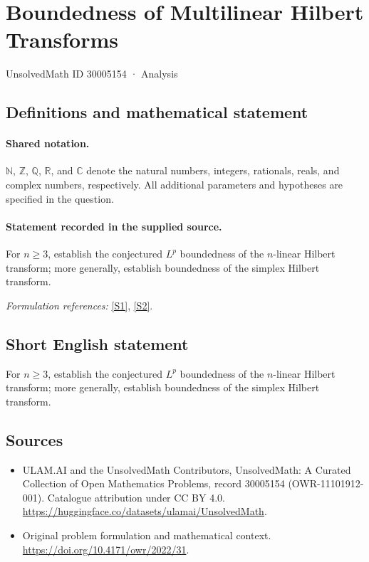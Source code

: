 \documentclass[11pt]{article}
\newcommand{\sref}[2]{\hyperlink{source:#1:#2}{[S#2]}}
\begin{document}
\setcounter{section}{30005153}
\section{Boundedness of Multilinear Hilbert Transforms}\label{30005154}
{\small UnsolvedMath ID 30005154 · Analysis}
\subsection{Definitions and mathematical statement}

\paragraph{Shared notation.}$\mathbb N$, $\mathbb Z$, $\mathbb Q$, $\mathbb R$, and $\mathbb C$ denote the natural numbers, integers, rationals, reals, and complex numbers, respectively. All additional parameters and hypotheses are specified in the question.


\paragraph{Statement recorded in the supplied source.}
For $n\geq3$, establish the conjectured $L^p$ boundedness of the $n$-linear Hilbert transform; more generally, establish boundedness of the simplex Hilbert transform.
\par\smallskip\textit{Formulation references:} \sref{30005154}{1}, \sref{30005154}{2}.
\subsection{Short English statement}
For $n\geq3$, establish the conjectured $L^p$ boundedness of the $n$-linear Hilbert transform; more generally, establish boundedness of the simplex Hilbert transform.
\subsection{Sources}
\begin{itemize}
\item[\hypertarget{source:30005154:1}{S1}] ULAM.AI and the UnsolvedMath Contributors, UnsolvedMath: A Curated Collection of Open Mathematics Problems, record 30005154 (OWR-11101912-001). Catalogue attribution under CC BY 4.0.
\url{https://huggingface.co/datasets/ulamai/UnsolvedMath}.
\item[\hypertarget{source:30005154:2}{S2}] Original problem formulation and mathematical context.
\url{https://doi.org/10.4171/owr/2022/31}.
\end{itemize}
\label{end:30005154}
\end{document}

